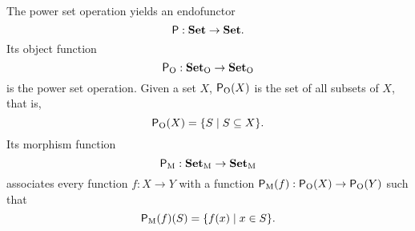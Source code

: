 \begin{example}

  \label{ex:functor-power-set}


  The power set operation yields an endofunctor
  \begin{equation*}
    \mathsf{P}: \mathbf{Set} \to \mathbf{Set}
    \text{.}
  \end{equation*}
  Its object function
  \begin{equation*}
    \mathsf{P}_{\operatorname{O}}: \mathcal{\mathbf{Set}}_{\operatorname{O}} \to \mathcal{\mathbf{Set}}_{\operatorname{O}}
  \end{equation*}
  is the power set operation. Given a set $X$, $\mathsf{P}_{\operatorname{O}}(X)$ is the
  set of all subsets of $X$, that is,
  \begin{equation}
    \label{eq:funcO-power-set}
    \mathsf{P}_{\operatorname{O}}(X) = \{S \mid S \subseteq X\}
    \text{.}
  \end{equation}
  Its morphism function
  \begin{equation*}
    \mathsf{P}_{\operatorname{M}}: \mathcal{\mathbf{Set}}_{\operatorname{M}} \to \mathcal{\mathbf{Set}}_{\operatorname{M}}
  \end{equation*}
  associates every function $f: X \to Y$ with a function
  $\mathsf{P}_{\operatorname{M}}(f): \mathsf{P}_{\operatorname{O}}(X) \to \mathsf{P}_{\operatorname{O}}(Y)$ such that
  \begin{equation}
    \label{eq:funcM-power-set}
    \mathsf{P}_{\operatorname{M}}(f)(S) = \{f(x) \mid x \in S\}
    \text{.}
  \end{equation}


\end{example}
